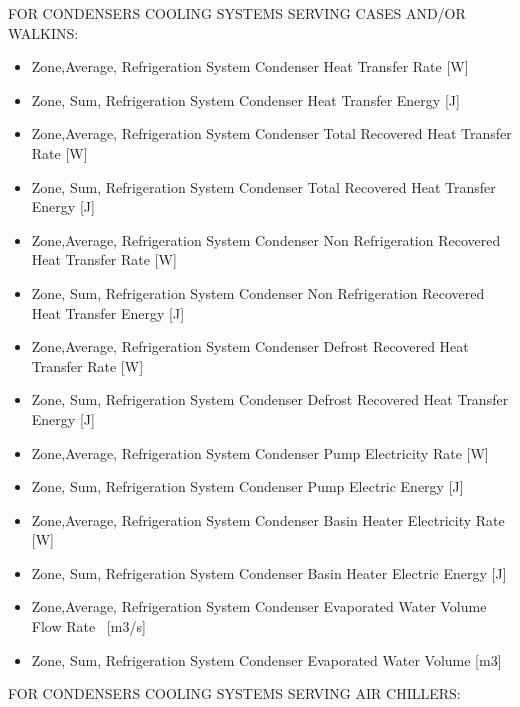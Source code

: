 FOR CONDENSERS COOLING SYSTEMS SERVING CASES AND/OR WALKINS:

\begin{itemize}
\item
  Zone,Average, Refrigeration System Condenser Heat Transfer Rate {[}W{]}
\item
  Zone, Sum, Refrigeration System Condenser Heat Transfer Energy {[}J{]}
\item
  Zone,Average, Refrigeration System Condenser Total Recovered Heat Transfer Rate {[}W{]}
\item
  Zone, Sum, Refrigeration System Condenser Total Recovered Heat Transfer Energy {[}J{]}
\item
  Zone,Average, Refrigeration System Condenser Non Refrigeration Recovered Heat Transfer Rate {[}W{]}
\item
  Zone, Sum, Refrigeration System Condenser Non Refrigeration Recovered Heat Transfer Energy {[}J{]}
\item
  Zone,Average, Refrigeration System Condenser Defrost Recovered Heat Transfer Rate {[}W{]}
\item
  Zone, Sum, Refrigeration System Condenser Defrost Recovered Heat Transfer Energy {[}J{]}
\item
  Zone,Average, Refrigeration System Condenser Pump Electricity Rate {[}W{]}
\item
  Zone, Sum, Refrigeration System Condenser Pump Electric Energy {[}J{]}
\item
  Zone,Average, Refrigeration System Condenser Basin Heater Electricity Rate {[}W{]}
\item
  Zone, Sum, Refrigeration System Condenser Basin Heater Electric Energy {[}J{]}
\item
  Zone,Average, Refrigeration System Condenser Evaporated Water Volume Flow Rate~ {[}m3/s{]}
\item
  Zone, Sum, Refrigeration System Condenser Evaporated Water Volume {[}m3{]}
\end{itemize}

FOR CONDENSERS COOLING SYSTEMS SERVING AIR CHILLERS:

